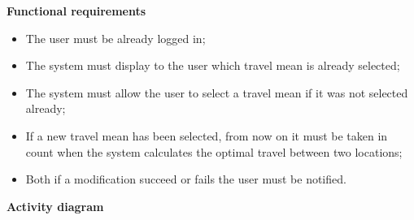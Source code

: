 \documentclass{article}
\begin{document}
	\bigskip
	\noindent
	\textbf{Functional requirements} \\
	\begin{itemize}
		\item The user must be already logged in;
		\item The system must display to the user which travel mean is already selected;
		\item The system must allow the user to select a travel mean if it was not selected already;
		\item If a new travel mean has been selected, from now on it must be taken in count when the system calculates the optimal travel between two locations;
		\item Both if a modification succeed or fails the user must be notified.
	\end{itemize}
	
	\newpage
	\noindent
	\textbf{Activity diagram} \\
	
\end{document}
